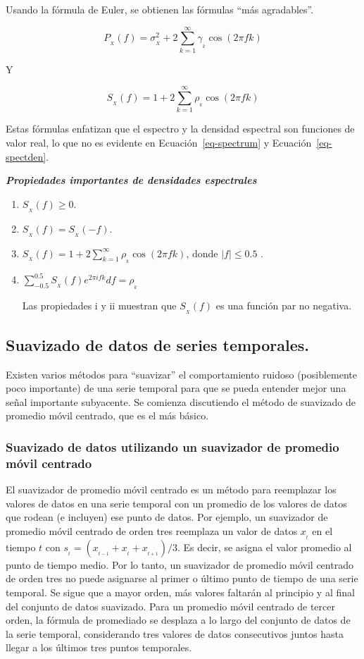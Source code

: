 \documentclass[
  us-letterpaper,
]{scrreprt}
\theoremstyle{plain}
\theoremstyle{definition}
\theoremstyle{plain}
\theoremstyle{definition}
\theoremstyle{remark}
\begin{document}
Usando la fórmula de Euler, se obtienen las fórmulas ``más agradables''.

\[
P_{_X}(f)=\sigma_{_X}^2+2\sum_{k=1}^\infty\gamma_{_k}\cos(2\pi fk)
\]

Y

\[
S_{_X}(f)=1+2\sum_{k=1}^\infty \rho_{_k}\cos(2\pi fk)
\]

Estas fórmulas enfatizan que el espectro y la densidad espectral son
funciones de valor real, lo que no es evidente en
Ecuación~\ref{eq-spectrum} y Ecuación~\ref{eq-spectden}.

\textbf{\emph{Propiedades importantes de densidades espectrales}}

\begin{enumerate}
\def\labelenumi{\roman{enumi}.}
\item
  \(S_{_X}(f)\geq 0\).
\item
  \(S_{_X}(f)=S_{_X}(-f)\).
\item
  \(S_{_X}(f)=1+2\sum\limits_{k=1}^\infty \rho_{_k}\cos(2\pi fk)\),
  donde \(|f|\le 0.5\) .
\item
  \(\sum\limits_{-0.5}^{0.5}S_{_X}(f)e^{2\pi ifk}df=\rho_{_k}\)

  Las propiedades i y ii muestran que \(S_{_X}(f)\) es una función par
  no negativa.
\end{enumerate}

\subsection{Suavizado de datos de series
temporales.}\label{suavizado-de-datos-de-series-temporales.}

Existen varios métodos para ``suavizar'' el comportamiento ruidoso
(posiblemente poco importante) de una serie temporal para que se pueda
entender mejor una señal importante subyacente. Se comienza discutiendo
el método de suavizado de promedio móvil centrado, que es el más básico.

\subsubsection{Suavizado de datos utilizando un suavizador de promedio
móvil centrado}\label{sec-mas}

El suavizador de promedio móvil centrado es un método para reemplazar
los valores de datos en una serie temporal con un promedio de los
valores de datos que rodean (e incluyen) ese punto de datos. Por
ejemplo, un suavizador de promedio móvil centrado de orden tres
reemplaza un valor de datos \(x_{_t}\) en el tiempo \(t\) con
\(s_{_t} = (x_{_{t-1}}+x_{_t}+x_{_{t+1}})/3\). Es decir, se asigna el
valor promedio al punto de tiempo medio. Por lo tanto, un suavizador de
promedio móvil centrado de orden tres no puede asignarse al primer o
último punto de tiempo de una serie temporal. Se sigue que a mayor
orden, más valores faltarán al principio y al final del conjunto de
datos suavizado. Para un promedio móvil centrado de tercer orden, la
fórmula de promediado se desplaza a lo largo del conjunto de datos de la
serie temporal, considerando tres valores de datos consecutivos juntos
hasta llegar a los últimos tres puntos temporales.
\end{document}
